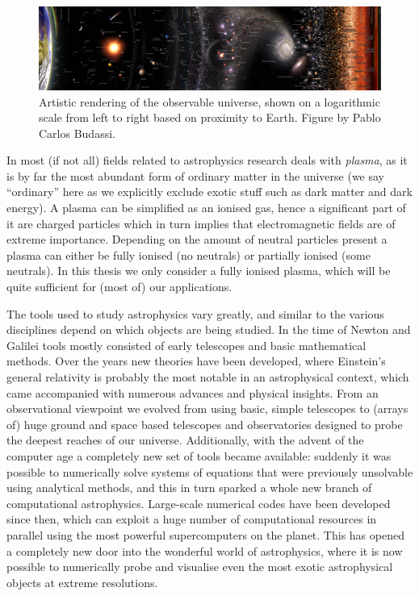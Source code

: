 \begin{figure}[t]
  \centering
  \includegraphics[width=\textwidth]{observable_universe.png}
  \caption{
    Artistic rendering of the observable universe, shown on a logarithmic scale from left to right based on proximity to Earth. Figure by Pablo Carlos Budassi.
  }
\end{figure}

In most (if not all) fields related to astrophysics research deals with \emph{plasma}, as it is by far the most abundant form of ordinary matter in the universe (we say ``ordinary'' here as we explicitly exclude exotic stuff such as dark matter and dark energy). A plasma can be simplified as an ionised gas, hence a significant part of it are charged particles which in turn implies that electromagnetic fields are of extreme importance. Depending on the amount of neutral particles present a plasma can either be fully ionised (no neutrals) or partially ionised (some neutrals). In this thesis we only consider a fully ionised plasma, which will be quite sufficient for (most of) our applications.

The tools used to study astrophysics vary greatly, and similar to the various disciplines depend on which objects are being studied. In the time of Newton and Galilei tools mostly consisted of early telescopes and basic mathematical methods. Over the years new theories have been developed, where Einstein's general relativity is probably the most notable in an astrophysical context, which came accompanied with numerous advances and physical insights. From an observational viewpoint we evolved from using basic, simple telescopes to (arrays of) huge ground and space based telescopes and observatories designed to probe the deepest reaches of our universe. Additionally, with the advent of the computer age a completely new set of tools became available: suddenly it was possible to numerically solve systems of equations that were previously unsolvable using analytical methods, and this in turn sparked a whole new branch of computational astrophysics. Large-scale numerical codes have been developed since then, which can exploit a huge number of computational resources in parallel using the most powerful supercomputers on the planet. This has opened a completely new door into the wonderful world of astrophysics, where it is now possible to numerically probe and visualise even the most exotic astrophysical objects at extreme resolutions.

